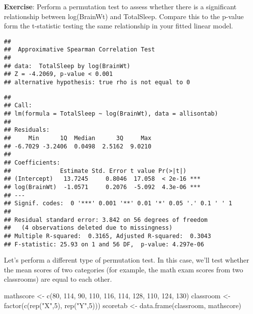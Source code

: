 \documentclass[
]{book}
\newenvironment{Shaded}{\begin{snugshade}}{\end{snugshade}}
\newcommand{\DecValTok}[1]{\textcolor[rgb]{0.00,0.00,0.81}{#1}}
\newcommand{\FunctionTok}[1]{\textcolor[rgb]{0.00,0.00,0.00}{#1}}
\newcommand{\NormalTok}[1]{#1}
\newcommand{\OtherTok}[1]{\textcolor[rgb]{0.56,0.35,0.01}{#1}}
\newcommand{\StringTok}[1]{\textcolor[rgb]{0.31,0.60,0.02}{#1}}
\begin{document}
\textbf{Exercise}: Perform a permutation test to assess whether there is a significant relationship between log(BrainWt) and TotalSleep. Compare this to the p-value form the t-statistic testing the same relationship in your fitted linear model.

\begin{verbatim}
## 
##  Approximative Spearman Correlation Test
## 
## data:  TotalSleep by log(BrainWt)
## Z = -4.2069, p-value < 0.001
## alternative hypothesis: true rho is not equal to 0
\end{verbatim}

\begin{verbatim}
## 
## Call:
## lm(formula = TotalSleep ~ log(BrainWt), data = allisontab)
## 
## Residuals:
##     Min      1Q  Median      3Q     Max 
## -6.7029 -3.2406  0.0498  2.5162  9.0210 
## 
## Coefficients:
##              Estimate Std. Error t value Pr(>|t|)    
## (Intercept)   13.7245     0.8046  17.058  < 2e-16 ***
## log(BrainWt)  -1.0571     0.2076  -5.092  4.3e-06 ***
## ---
## Signif. codes:  0 '***' 0.001 '**' 0.01 '*' 0.05 '.' 0.1 ' ' 1
## 
## Residual standard error: 3.842 on 56 degrees of freedom
##   (4 observations deleted due to missingness)
## Multiple R-squared:  0.3165, Adjusted R-squared:  0.3043 
## F-statistic: 25.93 on 1 and 56 DF,  p-value: 4.297e-06
\end{verbatim}

Let's perform a different type of permutation test. In this case, we'll test whether the mean scores of two categories (for example, the math exam scores from two classrooms) are equal to each other.

\begin{Shaded}
\begin{Highlighting}[]
\NormalTok{mathscore }\OtherTok{\textless{}{-}} \FunctionTok{c}\NormalTok{(}\DecValTok{80}\NormalTok{, }\DecValTok{114}\NormalTok{, }\DecValTok{90}\NormalTok{, }\DecValTok{110}\NormalTok{, }\DecValTok{116}\NormalTok{, }\DecValTok{114}\NormalTok{, }\DecValTok{128}\NormalTok{, }\DecValTok{110}\NormalTok{, }\DecValTok{124}\NormalTok{, }\DecValTok{130}\NormalTok{)}
\NormalTok{classroom }\OtherTok{\textless{}{-}} \FunctionTok{factor}\NormalTok{(}\FunctionTok{c}\NormalTok{(}\FunctionTok{rep}\NormalTok{(}\StringTok{"X"}\NormalTok{,}\DecValTok{5}\NormalTok{), }\FunctionTok{rep}\NormalTok{(}\StringTok{"Y"}\NormalTok{,}\DecValTok{5}\NormalTok{)))}
\NormalTok{scoretab }\OtherTok{\textless{}{-}} \FunctionTok{data.frame}\NormalTok{(classroom, mathscore)}
\end{Highlighting}
\end{Shaded}
\end{document}
